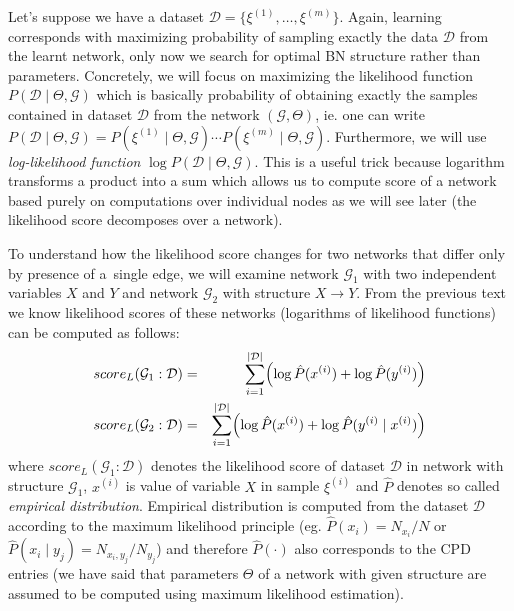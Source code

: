 \documentclass[english,cover]{fitthesis} %
\newcommand{\term}[1]{\emph{#1}}           %
\begin{document}
Let's suppose we have a dataset $\mathcal{D} = \lbrace \xi^{(1)}, \dots, \xi^{(m)} \rbrace$. Again, learning corresponds with maximizing probability of sampling exactly the data $\mathcal{D}$ from the learnt network, only now we search for optimal BN structure rather than parameters. Concretely, we will focus on maximizing the likelihood function $P(\mathcal{D} \mid \Theta, \mathcal{G})$ which is basically probability of obtaining exactly the samples contained in dataset $\mathcal{D}$ from the network $(\mathcal{G},\Theta)$, ie. one can write $P(\mathcal{D} \mid \Theta, \mathcal{G}) = P(\xi^{(1)} \mid \Theta, \mathcal{G}) \dotsm P(\xi^{(m)} \mid \Theta, \mathcal{G})$. Furthermore, we will use \term{log-likelihood function} $\log P(\mathcal{D} \mid \Theta, \mathcal{G})$. This is a useful trick because logarithm transforms a product into a sum which allows us to compute score of a network based purely on computations over individual nodes as we will see later (the likelihood score decomposes over a network).

To understand how the likelihood score changes for two networks that differ only by presence of a~single edge, we will examine network $\mathcal{G}_1$ with two independent variables $X$ and $Y$ and network $\mathcal{G}_2$ with structure $X \rightarrow Y$. From the previous text we know likelihood scores of these networks (logarithms of likelihood functions) can be computed as follows:
\begin{eqnarray*}
    score_L(\mathcal{G}_1 : \mathcal{D}) & = & \sum_{i=1}^{|\mathcal{D}|} \Bigl(\log \hat P(x^{(i)}) + \log \hat P(y^{(i)})\Bigr)\\
    score_L(\mathcal{G}_2 : \mathcal{D}) & = & \sum_{i=1}^{|\mathcal{D}|} \Bigl(\log \hat P(x^{(i)}) + \log \hat P(y^{(i)} \mid x^{(i)})\Bigr)
\end{eqnarray*}
where $score_L(\mathcal{G}_1 : \mathcal{D})$ denotes the likelihood score of dataset $\mathcal{D}$ in network with structure $\mathcal{G}_1$, $x^{(i)}$ is value of variable $X$ in sample $\xi^{(i)}$ and $\hat P$ denotes so called \term{empirical distribution}. Empirical distribution is computed from the dataset $\mathcal{D}$ according to the maximum likelihood principle (eg. $\hat P(x_i) = N_{x_i} / N$ or $\hat P(x_i \mid y_j) = N_{x_i,y_j} / N_{y_j}$) and therefore $\hat{P}(\cdot)$ also corresponds to the CPD entries (we have said that parameters $\Theta$ of a network with given structure are assumed to be computed using maximum likelihood estimation).
\end{document}
